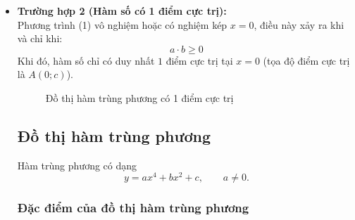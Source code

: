 \begin{itemize}
    \item \textbf{Trường hợp 2 (Hàm số có 1 điểm cực trị):} \\
    Phương trình (1) vô nghiệm hoặc có nghiệm kép $x = 0$, điều này xảy ra khi và chỉ khi:
    \[ a \cdot b \geq 0 \]
    Khi đó, hàm số chỉ có duy nhất $1$ điểm cực trị tại $x = 0$ (tọa độ điểm cực trị là $A(0; c)$).
\begin{figure}[H]
    \centering
    \caption{Đồ thị hàm trùng phương có 1 điểm cực trị}
\end{figure}
      
   


\subsection{Đồ thị hàm trùng phương}

Hàm trùng phương có dạng
\[
y=ax^4+bx^2+c,\qquad a\neq 0.
\]

\subsubsection{Đặc điểm của đồ thị hàm trùng phương}


\end{itemize}
